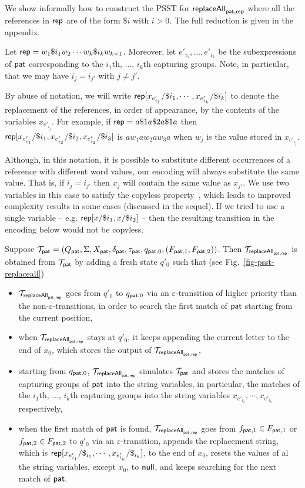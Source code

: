 We show informally how to construct the PSST for $\mathsf{replaceAll}_{\mathsf{pat}, \mathsf{rep}}$ where all the references in $\mathsf{rep}$ are of the form $\$i$ with $i > 0$.
The full reduction is given in the appendix.

Let $\mathsf{rep} = w_1 \$i_1 w_2 \cdots w_k \$i_k w_{k+1}$. Moreover, let $e'_{i_1},\ldots, e'_{i_k}$ be the subexpressions of $\mathsf{pat}$ corresponding to the $i_1$th, $\ldots$, $i_k$th capturing groups.
Note, in particular, that we may have $i_j = i_{j'}$ with $j \neq j'$.

By abuse of notation, we will write
$\mathsf{rep}[x_{e'_{i_1}}/\$i_1,\cdots,x_{e'_{i_k}}/\$i_k]$
to denote the replacement of the references, in order of appearance, by the contents of the variables $x_{e'_{i_j}}$.
For example, if
$\mathsf{rep} = a \$1 a \$2 a \$1 a$
then
$\mathsf{rep}[x_{e'_{i_1}}/\$i_1, x_{e'_{i_2}}/\$i_2,x_{e'_{i_3}}/\$i_3]$
is $a w_1 a w_2 a w_3 a$ when $w_j$ is the value stored in $x_{e'_{i_j}}$.

Although, in this notation, it is possible to substitute different occurrences of a reference with different word values, our encoding will always substitute the same value.
That is, if $i_j = i_{j'}$ then $x_j$ will contain the same value as $x_{j'}$.
We use two variables in this case to satisfy the copyless property~\cite{AC10}, which leads to improved complexity results in some cases (discussed in the sequel).
If we tried to use a single variable – e.g. $\mathsf{rep}[x/\$i_1,x/\$i_2]$ – then the resulting transition in the encoding below would not be copyless.

 Suppose $\mathcal{T}_{\mathsf{pat}} = (Q_{\mathsf{pat}}, \Sigma, X_{\mathsf{pat}}, \delta_{\mathsf{pat}}, \tau_{\mathsf{pat}}, q_{\mathsf{pat},0}, (F_{\mathsf{pat},1}, F_{\mathsf{pat},2}))$.
Then $\mathcal{T}_{\mathsf{replaceAll}_{\mathsf{pat},\mathsf{rep}}}$ is obtained from $\mathcal{T}_{\mathsf{pat}}$ by adding a fresh state $q'_0$ such that (see Fig.~\ref{fig-psst-replaceall})
\begin{itemize}
    \item $\mathcal{T}_{\mathsf{replaceAll}_{\mathsf{pat},\mathsf{rep}}}$ goes from $q'_0$ to $q_{\mathsf{pat},0}$ via an $\varepsilon$-transition of higher priority than the non-$\varepsilon$-transitions, in order to search the first match of $\mathsf{pat}$ starting from the current position,
    \item when $\mathcal{T}_{\mathsf{replaceAll}_{\mathsf{pat},\mathsf{rep}}}$ stays at $q'_0$, it keeps appending the current letter to the end of $x_0$, which stores the output of $\mathcal{T}_{\mathsf{replaceAll}_{\mathsf{pat},\mathsf{rep}}}$,
    \item starting from $q_{\mathsf{pat}, 0}$, $\mathcal{T}_{\mathsf{replaceAll}_{\mathsf{pat},\mathsf{rep}}}$ simulates $\mathcal{T}_{\mathsf{pat}}$ and stores the matches of capturing groups of $\mathsf{pat}$ into the string variables, in particular,
    the matches of the $i_1$th, $\ldots$, $i_k$th capturing groups into the string variables $x_{e'_{i_1}}, \cdots, x_{e'_{i_k}}$ respectively,
    \item when the first match of $\mathsf{pat}$ is found, $\mathcal{T}_{\mathsf{replaceAll}_{\mathsf{pat},\mathsf{rep}}}$ goes from $f_{\mathsf{pat},1} \in F_{\mathsf{pat}, 1}$ or $f_{\mathsf{pat}, 2} \in F_{\mathsf{pat}, 2}$ to $q'_0$ via an $\varepsilon$-transition, appends the replacement string, which is $\mathsf{rep}[x_{e'_{i_1}}/\$_{i_1}, \cdots, x_{e'_{i_k}}/\$_{i_k}]$, to the end of $x_0$, resets the values of al the string variables, except $x_0$, to $\mathsf{null}$, and keeps searching for the next match of $\mathsf{pat}$.
\end{itemize}

